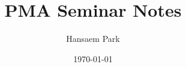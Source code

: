 \usepackage[a4paper, margin=1in]{geometry}

\usepackage{amsmath, amssymb, amsthm}
\usepackage{mathtools}

\usepackage{enumitem}

\usepackage[colorlinks=true, linkcolor=blue, urlcolor=blue, citecolor=blue]{hyperref}

\theoremstyle{definition}
\newtheorem{definition}{Definition}[section]
\newtheorem{example}[definition]{Example}
\newtheorem{exercise}{Exercise}

\theoremstyle{plain}
\newtheorem{theorem}[definition]{Theorem}
\newtheorem{lemma}[definition]{Lemma}
\newtheorem{proposition}[definition]{Proposition}
\newtheorem*{corollary}{Corollary}

\theoremstyle{remark}
\newtheorem{remark}[definition]{Remark}

\newcommand{\N}{\mathbb{N}}
\newcommand{\Z}{\mathbb{Z}}
\newcommand{\Q}{\mathbb{Q}}
\newcommand{\R}{\mathbb{R}}
\newcommand{\C}{\mathbb{C}}


\DeclareMathOperator{\id}{id}
\DeclareMathOperator{\im}{im}
\DeclareMathOperator{\rank}{rank}
\DeclareMathOperator{\spanv}{span}
\DeclareMathOperator{\diam}{diam}

\title{PMA Seminar Notes}
\author{Hansaem Park}
\date{\today}
